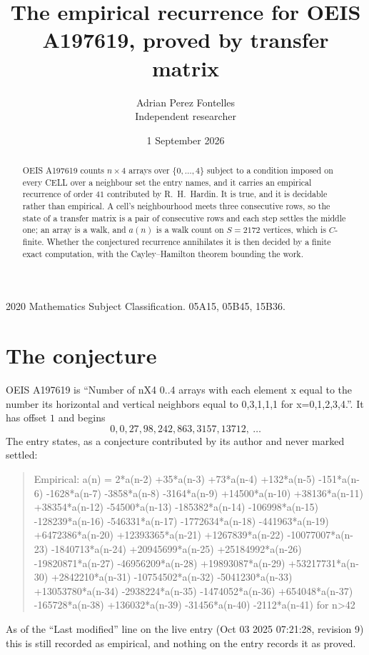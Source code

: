 \documentclass[11pt,a4paper]{article}
\title{The empirical recurrence for OEIS A197619, proved by transfer matrix}
\author{Adrian Perez Fontelles\\ \small Independent researcher}
\date{1 September 2026}
\theoremstyle{plain}
\theoremstyle{definition}
\begin{document}
\maketitle

\begin{abstract}
OEIS A197619 counts $n\times4$ arrays over $\{0,\dots,4\}$ subject to a condition imposed on
every CELL over a neighbour set the entry names, and it carries an empirical recurrence of
order $41$ contributed by R.~H.~Hardin. It is true, and it is decidable rather than
empirical. A cell's neighbourhood meets three consecutive rows, so the state of a transfer
matrix is a pair of consecutive rows and each step settles the middle one; an array is a
walk, and $a(n)$ is a walk count on $S=2172$ vertices, which is $C$-finite. Whether the
conjectured recurrence annihilates it is then decided by a finite exact computation, with the
Cayley--Hamilton theorem bounding the work.
\end{abstract}

\noindent\small 2020 Mathematics Subject Classification. 05A15, 05B45, 15B36.\normalsize

\section{The conjecture}

OEIS A197619 is ``Number of nX4 0..4 arrays with each element x equal to the number its horizontal and vertical neighbors equal to 0,3,1,1,1 for x=0,1,2,3,4.''. It has offset $1$ and begins
\[
0, 0, 27, 98, 242, 863, 3157, 13712,\ \dots
\]
The entry states, as a conjecture contributed by its author and never marked settled:
\begin{quote}
Empirical: a(n) = 2*a(n-2) +35*a(n-3) +73*a(n-4) +132*a(n-5) -151*a(n-6) -1628*a(n-7) -3858*a(n-8) -3164*a(n-9) +14500*a(n-10) +38136*a(n-11) +38354*a(n-12) -54500*a(n-13) -185382*a(n-14) -106998*a(n-15) -128239*a(n-16) -546331*a(n-17) -1772634*a(n-18) -441963*a(n-19) +6472386*a(n-20) +12393365*a(n-21) +1267839*a(n-22) -10077007*a(n-23) -1840713*a(n-24) +20945699*a(n-25) +25184992*a(n-26) -19820871*a(n-27) -46956209*a(n-28) +19893087*a(n-29) +53217731*a(n-30) +2842210*a(n-31) -10754502*a(n-32) -5041230*a(n-33) +13053780*a(n-34) -2938224*a(n-35) -1474052*a(n-36) +654048*a(n-37) -165728*a(n-38) +136032*a(n-39) -31456*a(n-40) -2112*a(n-41) for n>42
\end{quote}
As of the ``Last modified'' line on the live entry (Oct 03 2025 07:21:28, revision 9) this is still
recorded as empirical, and nothing on the entry records it as proved.
\end{document}
